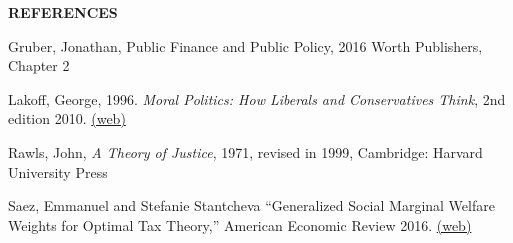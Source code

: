 \documentclass[landscape]{slides}
\begin{document}
\begin{slide}
\begin{center}
{\bf REFERENCES}
\end{center}
{\small

Gruber, Jonathan, Public Finance and Public Policy, 2016 Worth Publishers, Chapter 2

Lakoff, George, 1996. \emph{Moral Politics: How Liberals and Conservatives Think}, 2nd edition 2010.
\href{https://georgelakoff.com/} {(web)}

Rawls, John, \emph{A Theory of Justice}, 1971, revised in 1999, Cambridge: Harvard University Press

Saez, Emmanuel and Stefanie Stantcheva ``Generalized Social Marginal Welfare Weights for Optimal Tax Theory,'' American Economic Review 2016. \href{http://eml.berkeley.edu/~saez/saez-stantchevaAER16.pdf} {(web)}

}
\end{slide}
\end{document}
